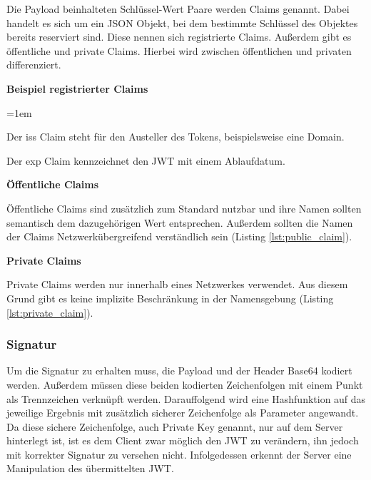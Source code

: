 Die Payload beinhalteten Schlüssel-Wert Paare werden Claims genannt. Dabei handelt es sich um ein JSON Objekt, bei dem bestimmte Schlüssel des Objektes bereits reserviert sind. Diese nennen sich registrierte Claims. Au{\ss}erdem gibt es öffentliche und private Claims. Hierbei wird zwischen öffentlichen und privaten differenziert.

\noindent
\textbf{Beispiel registrierter Claims}

\begin{description}
	\leftskip=1em
	\item[iss]
	Der iss Claim steht für den Austeller des Tokens, beispielsweise eine Domain.
	\item[exp] Der exp Claim kennzeichnet den \gls{JWT} mit einem Ablaufdatum.
\end{description}

\noindent
\textbf{Öffentliche Claims}

Öffentliche Claims sind zusätzlich zum Standard nutzbar und ihre Namen sollten semantisch dem dazugehörigen Wert entsprechen. Au{\ss}erdem sollten die Namen der Claims Netzwerkübergreifend verständlich sein (Listing \ref{lst:public_claim}).

\noindent
\textbf{Private Claims}

Private Claims werden nur innerhalb eines Netzwerkes verwendet. Aus diesem Grund gibt es keine implizite Beschränkung in der Namensgebung (Listing \ref{lst:private_claim}).

\begin{minipage}{\linewidth}
	

	
\end{minipage}

\subsubsection{Signatur}
\label{sec: jwt_signature}

Um die Signatur zu erhalten muss, die Payload und der Header Base64 kodiert werden. Au{\ss}erdem müssen diese beiden kodierten Zeichenfolgen mit einem Punkt als Trennzeichen verknüpft werden. Darauffolgend wird eine Hashfunktion auf das jeweilige Ergebnis mit zusätzlich sicherer Zeichenfolge als Parameter angewandt. Da diese sichere Zeichenfolge, auch Private Key genannt, nur auf dem Server hinterlegt ist, ist es dem Client zwar möglich den \gls{JWT} zu verändern, ihn jedoch mit korrekter Signatur zu versehen nicht. Infolgedessen erkennt der Server eine Manipulation des übermittelten \gls{JWT}.

